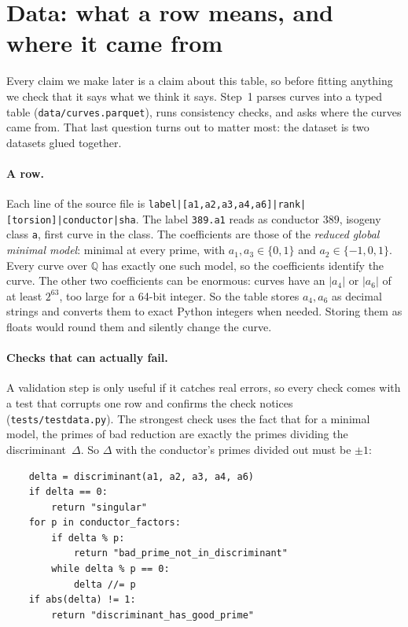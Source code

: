 \documentclass[11pt]{article}
\theoremstyle{definition}
\theoremstyle{plain}
\theoremstyle{remark}
\newcommand{\Q}{\mathbb{Q}}
\newcommand{\code}[1]{\texttt{#1}}
\renewcommand{\_}{\oldunderscore\allowbreak}
\newcommand{\file}[1]{\textcolor{blue!50!black}{\texttt{#1}}}
\newcommand{\codefrom}[1]{\par\smallskip\noindent{\footnotesize\textbf{From} \file{#1}}}
\begin{document}
\section{Data: what a row means, and where it came from}
\label{sec:data}

Every claim we make later is a claim about this table, so before fitting anything we check
that it says what we think it says. Step~1 parses \NCurves{} curves into a typed table
(\file{data/curves.parquet}), runs \NChecks{} consistency checks, and asks where the curves came from.
That last question turns out to matter most: the dataset is two datasets glued together.

\paragraph{A row.}
Each line of the source file is
\code{label|[a1,a2,a3,a4,a6]|rank|[torsion]|conductor|sha}. The label
\code{389.a1} reads as conductor $389$, isogeny class \code{a}, first curve in the class. The
coefficients are those of the \emph{reduced global minimal model}: minimal at every prime,
with $a_1,a_3\in\{0,1\}$ and $a_2\in\{-1,0,1\}$. Every curve over $\Q$ has exactly one such
model, so the coefficients identify the curve. The other two coefficients can be enormous:
\NBigCoeffs{} curves have an $|a_4|$ or $|a_6|$ of at least $2^{63}$, too large for a 64-bit
integer. So the table stores $a_4,a_6$ as decimal strings and converts them to exact Python
integers when needed. Storing them as floats would round them and silently change the curve.

\paragraph{Checks that can actually fail.}
A validation step is only useful if it catches real errors, so every check comes with a test
that corrupts one row and confirms the check notices (\file{tests/test\_data.py}). The
strongest check uses the fact that for a minimal model, the primes of bad reduction are
exactly the primes dividing the discriminant~$\Delta$. So $\Delta$ with the conductor's primes
divided out must be $\pm1$:

\codefrom{src/eclab/data/validate.py}
\begin{lstlisting}
    delta = discriminant(a1, a2, a3, a4, a6)
    if delta == 0:
        return "singular"
    for p in conductor_factors:
        if delta % p:
            return "bad_prime_not_in_discriminant"
        while delta % p == 0:
            delta //= p
    if abs(delta) != 1:
        return "discriminant_has_good_prime"
\end{lstlisting}
\end{document}
